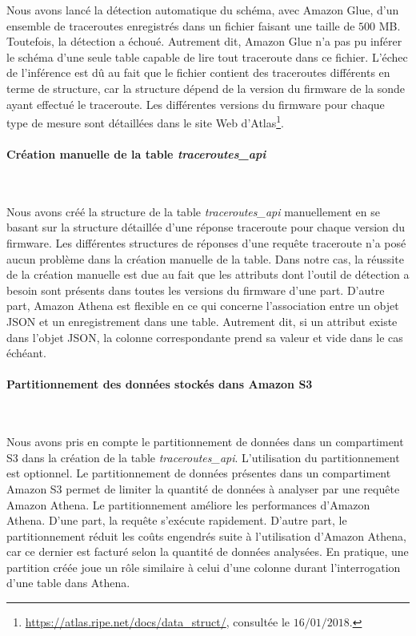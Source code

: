 Nous avons lancé    la détection automatique du schéma, avec Amazon Glue, d'un ensemble de  traceroutes enregistrés dans un fichier faisant une taille de $500$ MB. Toutefois, la détection a échoué. Autrement dit, Amazon Glue n'a pas pu inférer le schéma d'une seule table capable de lire tout traceroute dans ce fichier.  L'échec de l'inférence est dû au fait que le fichier contient des traceroutes différents en terme de structure, car la structure dépend de la version du firmware de la sonde ayant effectué le traceroute. Les différentes versions du firmware  pour chaque type de mesure sont détaillées dans le site Web d'Atlas\footnote{\url{https://atlas.ripe.net/docs/data_struct/}, consultée le $16/01/2018$.}.
 
\paragraph{Création manuelle de la table \textit{traceroutes\_api}}~

Nous avons créé la structure de la table \textit{traceroutes\_api}  manuellement en se basant sur la structure détaillée d'une réponse traceroute pour chaque version du firmware. Les différentes structures de réponses d'une requête traceroute n'a posé aucun problème dans la création manuelle de la table. Dans notre cas, la réussite de la création manuelle est due au fait que les attributs dont l'outil de détection a besoin sont présents dans toutes les versions du firmware d'une part. D'autre part, Amazon Athena est flexible en ce qui concerne l'association entre un objet JSON et un enregistrement dans une table. Autrement dit, si un attribut existe dans l'objet JSON, la colonne correspondante prend sa valeur et vide dans le cas échéant.  

\paragraph{Partitionnement des données stockés dans Amazon S3}~

Nous avons   pris en compte  le partitionnement de données dans un compartiment S3 dans la création de la table \textit{traceroutes\_api}.  L'utilisation du partitionnement est optionnel. 
Le partitionnement  de données présentes dans un compartiment Amazon S3 permet de limiter la quantité de données à analyser par une requête Amazon Athena. Le partitionnement améliore  les performances d'Amazon Athena. D'une part, la requête s'exécute rapidement. D'autre part, le partitionnement réduit les coûts engendrés  suite à l'utilisation d'Amazon Athena, car ce dernier est facturé selon la quantité de données analysées. En pratique,  une partition créée joue un rôle similaire à celui d'une colonne durant l'interrogation d'une table dans Athena. 

